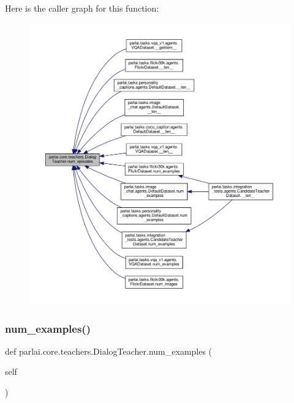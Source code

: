 Here is the caller graph for this function\+:
\nopagebreak
\begin{figure}[H]
\begin{center}
\leavevmode
\includegraphics[width=350pt]{classparlai_1_1core_1_1teachers_1_1DialogTeacher_af1e90a07058dc489c45280f0982e21be_icgraph}
\end{center}
\end{figure}
\mbox{\label{classparlai_1_1core_1_1teachers_1_1DialogTeacher_ad90c8cac27f2db22db77e29828b94dfe}} 
\subsubsection{\texorpdfstring{num\+\_\+examples()}{num\_examples()}}
{\footnotesize\ttfamily def parlai.\+core.\+teachers.\+Dialog\+Teacher.\+num\+\_\+examples (\begin{DoxyParamCaption}\item[{}]{self }\end{DoxyParamCaption})}

